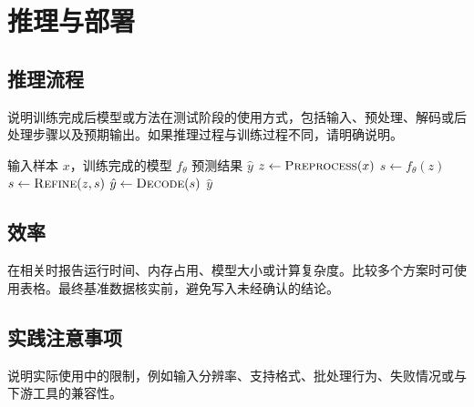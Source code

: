 \section{推理与部署}

\subsection{推理流程}

说明训练完成后模型或方法在测试阶段的使用方式，包括输入、预处理、解码或后处理步骤以及预期输出。如果推理过程与训练过程不同，请明确说明。

\begin{algorithm}[t]
  \caption{\textbf{推理流程示例。} 请替换为实际算法步骤。}
  \label{alg:inference}
  \begin{algorithmic}[1]
    \Require 输入样本 $x$，训练完成的模型 $f_{\theta}$
    \Ensure 预测结果 $\hat{y}$
    \State $z \gets \textsc{Preprocess}(x)$
    \State $s \gets f_{\theta}(z)$
      \State $s \gets \textsc{Refine}(z, s)$
    \EndIf
    \State $\hat{y} \gets \textsc{Decode}(s)$
    \State \Return $\hat{y}$
  \end{algorithmic}
\end{algorithm}

\subsection{效率}

在相关时报告运行时间、内存占用、模型大小或计算复杂度。比较多个方案时可使用表格。最终基准数据核实前，避免写入未经确认的结论。

\subsection{实践注意事项}

说明实际使用中的限制，例如输入分辨率、支持格式、批处理行为、失败情况或与下游工具的兼容性。
